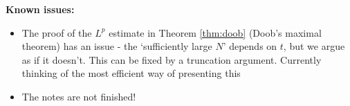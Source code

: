 \textbf{Known issues:}
\begin{itemize}
\item The proof of the $L^p$ estimate in Theorem \ref{thm:doob} (Doob's maximal theorem) has an issue - the `sufficiently large $N$' depends on $t$, but we argue as if it doesn't.
  This can be fixed by a truncation argument.
  Currently thinking of the most efficient way of presenting this
\item The notes are not finished!
\end{itemize}

  





